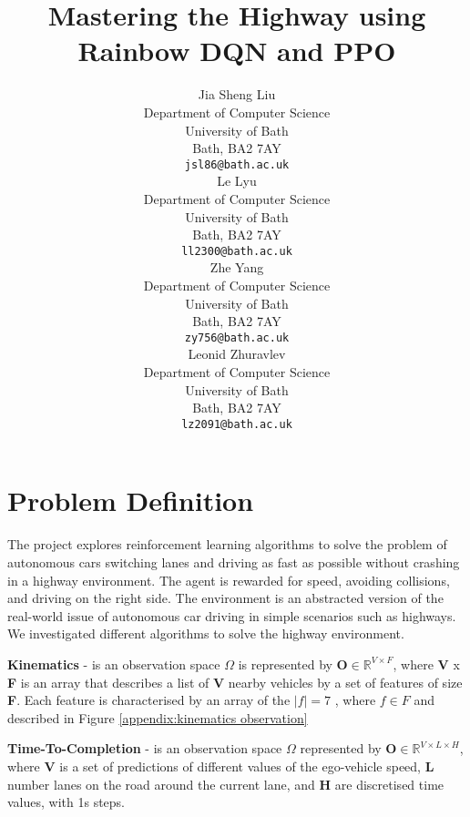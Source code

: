 \documentclass{article}
\title{Mastering the Highway using Rainbow DQN and PPO}
\author{
  Jia Sheng Liu \\
  Department of Computer Science \\
  University of Bath \\
  Bath, BA2 7AY \\
  \texttt{jsl86@bath.ac.uk} \\
  \And
  Le Lyu \\
  Department of Computer Science \\
  University of Bath \\
  Bath, BA2 7AY \\
  \texttt{ll2300@bath.ac.uk} \\
  \And
  Zhe Yang \\
  Department of Computer Science \\
  University of Bath \\
  Bath, BA2 7AY \\
  \texttt{zy756@bath.ac.uk} \\
  \And
  Leonid Zhuravlev \\
  Department of Computer Science \\
  University of Bath \\
  Bath, BA2 7AY \\
  \texttt{lz2091@bath.ac.uk} \\
}
\begin{document}
\maketitle

\vspace*{-22pt}


\section{Problem Definition}



The project explores reinforcement learning algorithms to solve the problem of autonomous cars switching lanes and driving as fast as possible without crashing in a highway environment. The agent is rewarded for speed, avoiding collisions, and driving on the right side. The environment is an abstracted version of the real-world issue of autonomous car driving in simple scenarios such as highways. We investigated different algorithms to solve the highway environment.


\textbf{Kinematics} - is an observation space $\Omega $ is represented by $\textbf{O} \in \mathbb{R}^{V \times F}$, where  \textbf{V} x \textbf{F} is an array that describes a list of \textbf{V} nearby vehicles by a set of features of size \textbf{F}.
Each feature is characterised by an array of the $|f| = 7 $ , where $f \in F $ and described in Figure \ref{appendix:kinematics observation} \cite{leurent_social_2019}


\textbf{Time-To-Completion} - is an observation space $\Omega$ represented by $\textbf{O} \in \mathbb{R}^{V \times L \times H}$, where $\textbf{V}$ is a set of predictions of different values of the ego-vehicle speed, $\textbf{L}$ number lanes on the road around the current lane, and $\textbf{H}$ are discretised time values, with 1s steps.
\end{document}
